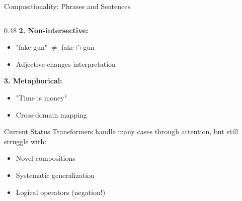 \documentclass[aspectratio=169]{beamer}
\begin{document}
\begin{frame}[shrink=10]{Compositionality: Phrases and Sentences 🧩}
\begin{columns}[T]
\begin{column}{0.48\textwidth}
\vspace{0.3em}
\textbf{2. Non-intersective:}
\begin{itemize}\setlength{\itemsep}{0pt}
    \item "fake gun" $\neq$ fake $\cap$ gun
    \item Adjective changes interpretation
\end{itemize}

\vspace{0.3em}
\textbf{3. Metaphorical:}
\begin{itemize}\setlength{\itemsep}{0pt}
    \item "Time is money"
    \item Cross-domain mapping
\end{itemize}

\vspace{1em}
\begin{alertblock}{Current Status}
Transformers handle many cases through attention, but still struggle with:
\begin{itemize}\setlength{\itemsep}{0pt}
    \item Novel compositions
    \item Systematic generalization
    \item Logical operators (negation!)
\end{itemize}
\end{alertblock}
\end{column}
\end{columns}
\end{frame}
\end{document}
